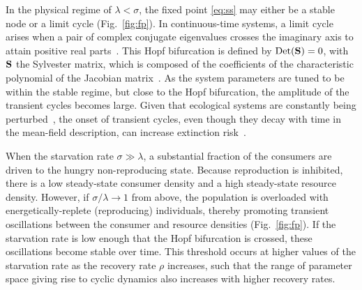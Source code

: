 \documentclass[twocolumn,preprintnumbers,amsmath,amssymb,superscriptaddress]{revtex4}
\begin{document}
\begin{bibunit}[unsrt]
In the physical regime of $\lambda<\sigma$, the fixed point \eqref{eq:ss} may either be a stable node or a limit cycle (Fig.~\ref{fig:fp}).
In continuous-time systems, a limit cycle arises when a pair of complex conjugate eigenvalues crosses the imaginary axis to attain positive real parts~\citep{GuckHolmes}.
This Hopf bifurcation is defined by ${\rm Det}({\bf S}) = 0$, with $\bf S$ the Sylvester matrix, which is composed of the coefficients of the characteristic polynomial of the Jacobian matrix~\citep{Gross:2004p2428}.
As the system parameters are tuned to be within the stable regime, but close to the Hopf bifurcation, the amplitude of the transient cycles becomes large.
Given that ecological systems are constantly being perturbed~\citep{Hastings:2001jh}, the onset of transient cycles, even though they decay with time in the mean-field description, can increase extinction risk~\citep{Neubert:1997wk,Caswell:2005eo,Neubert:2009td}.

When the starvation rate $\sigma\gg\lambda$, a substantial fraction of the consumers are driven to the hungry non-reproducing state.
Because reproduction is inhibited, there is a low steady-state consumer density and a high steady-state resource density.
However, if $\sigma/\lambda\to 1$ from above, the population is overloaded with energetically-replete (reproducing) individuals, thereby promoting transient oscillations between the consumer and resource densities (Fig.~\ref{fig:fp}).
If the starvation rate is low enough that the Hopf bifurcation is crossed, these oscillations become stable over time.
This threshold occurs at higher values of the starvation rate as the recovery rate $\rho$ increases, such that the range of parameter space giving rise to cyclic dynamics also increases with higher recovery rates.



\end{bibunit}
\end{document}

